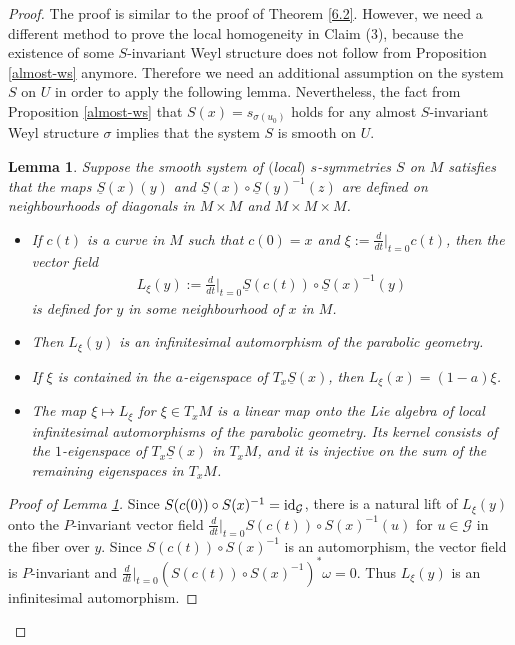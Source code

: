 \documentclass[10pt,a4paper]{amsart}
\newcommand{\om}{\omega}
\newcommand{\si}{\sigma}
\newcommand{\un}{\underline}
\newcommand{\ba}{\mathcal{G}}
\newcommand{\id}{{\rm id}}
\numberwithin{equation}{section}
\newtheorem{Lemma}[Theorem]{Lemma}
\begin{document}
\begin{proof}
The proof is similar to the proof of Theorem \ref{6.2}. However, we need a dif\/ferent method to prove the local homogeneity in Claim (3), because the existence of some $S$-invariant Weyl structure does not follow from Proposition \ref{almost-ws} anymore. Therefore we need an additional assumption on the system $S$ on $U$ in order to apply the following lemma. Nevertheless, the fact from Proposition \ref{almost-ws} that $S(x)=s_{\si(u_0)}$ holds for any almost $S$-invariant Weyl structure $\si$ implies that the system $S$ is smooth on $U$.

\begin{Lemma}\label{infaut}
Suppose the smooth system of $($local$)$ $s$-symmetries $S$ on $M$ satisfies that the maps $\un S(x)(y)$ and $\un S(x)\circ \un S(y)^{-1}(z)$ are defined on neighbourhoods of diagonals in $M\times M$ and $M\times M\times M$.
\begin{itemize}\itemsep=0pt
\item If $c(t)$ is a curve in $M$ such that $c(0)=x$ and $\xi:=\frac{d}{dt}|_{t=0}c(t)$,
then the vector field
\begin{gather*}L_\xi(y):=\frac{d}{dt}\Big|_{t=0} \un S(c(t)) \circ \un S(x)^{-1}(y)\end{gather*}
 is defined for $y$ in some neighbourhood of $x$ in $M$.
\item Then $L_\xi(y)$ is an infinitesimal automorphism of the parabolic geometry.
\item If $\xi$ is contained in the $a$-eigenspace of $T_x\un S(x)$, then $L_\xi(x)=(1-a)\xi$.
\item The map $\xi\mapsto L_\xi$ for $\xi \in T_xM$ is a linear map onto the Lie algebra of local infinitesimal automorphisms of the parabolic geometry. Its kernel consists of the $1$-eigenspace of $T_x\un S(x)$ in $T_xM$, and it is injective on the sum of the remaining eigenspaces in $T_xM$.
\end{itemize}
\end{Lemma}
\begin{proof}[Proof of Lemma \ref{infaut}]
Since $S(c(0)) \circ S(x)^{-1}=\id_\ba$, there is a natural lift of $L_\xi(y)$ onto the $P$-invariant vector f\/ield $\frac{d}{dt}|_{t=0}S(c(t))\circ S(x)^{-1}(u)$ for $u\in \ba$ in the f\/iber over $y$. Since $S(c(t)) \circ S(x)^{-1}$ is an automorphism, the vector f\/ield is $P$-invariant and $\frac{d}{dt}|_{t=0}(S(c(t)) \circ S(x)^{-1})^*\om=0$. Thus $L_\xi(y)$ is an inf\/initesimal automorphism.


\end{proof}
\end{proof}
\end{document}
